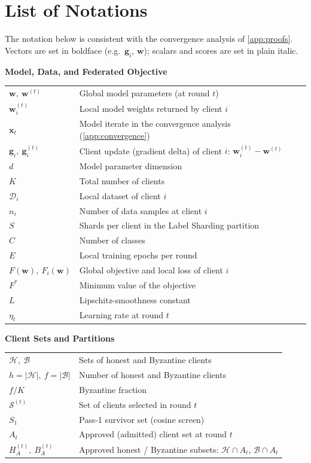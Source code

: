 \chapter*{List of Notations}

The notation below is consistent with the convergence analysis of
\cref{app:proofs}. Vectors are set in boldface (e.g.\ $\mathbf{g}_i$,
$\mathbf{w}$); scalars and scores are set in plain italic.

\vspace{1em}
\noindent\textbf{Model, Data, and Federated Objective}
\begin{tabular}{ll}
$\mathbf{w},\ \mathbf{w}^{(t)}$ & Global model parameters (at round $t$) \\
$\mathbf{w}_i^{(t)}$ & Local model weights returned by client $i$ \\
$\mathbf{x}_t$ & Model iterate in the convergence analysis (\cref{app:convergence}) \\
$\mathbf{g}_i,\ \mathbf{g}_i^{(t)}$ & Client update (gradient delta) of client $i$: $\mathbf{w}_i^{(t)}-\mathbf{w}^{(t)}$ \\
$d$ & Model parameter dimension \\
$K$ & Total number of clients \\
$\mathcal{D}_i$ & Local dataset of client $i$ \\
$n_i$ & Number of data samples at client $i$ \\
$S$ & Shards per client in the Label Sharding partition \\
$C$ & Number of classes \\
$E$ & Local training epochs per round \\
$F(\mathbf{w}),\ F_i(\mathbf{w})$ & Global objective and local loss of client $i$ \\
$F^{*}$ & Minimum value of the objective \\
$L$ & Lipschitz-smoothness constant \\
$\eta_t$ & Learning rate at round $t$ \\
\end{tabular}

\vspace{1em}
\noindent\textbf{Client Sets and Partitions}
\begin{tabular}{ll}
$\mathcal{H},\ \mathcal{B}$ & Sets of honest and Byzantine clients \\
$h=|\mathcal{H}|,\ f=|\mathcal{B}|$ & Number of honest and Byzantine clients \\
$f/K$ & Byzantine fraction \\
$\mathcal{S}^{(t)}$ & Set of clients selected in round $t$ \\
$S_1$ & Pass-1 survivor set (cosine screen) \\
$A_t$ & Approved (admitted) client set at round $t$ \\
$H_A^{(t)},\ B_A^{(t)}$ & Approved honest / Byzantine subsets: $\mathcal{H}\cap A_t$, $\mathcal{B}\cap A_t$ \\
\end{tabular}

